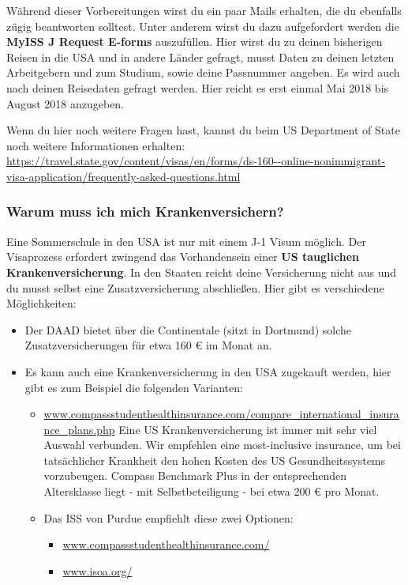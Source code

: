\documentclass[
  paper=a4,
  fontsize=12pt,
  DIV=16,
  headheight=52pt,
  footheight=45pt,
  headinclude,
  parskip=full,
]{scrartcl}
\begin{document}
Während dieser Vorbereitungen wirst du ein paar Mails erhalten, die du
ebenfalls zügig beantworten solltest.
Unter anderem wirst du dazu aufgefordert werden die
\textbf{MyISS J Request E-forms} auszufüllen.
Hier wirst du zu deinen bisherigen Reisen in die USA und in andere Länder
gefragt, musst Daten zu deinen letzten Arbeitgebern und zum Studium, sowie
deine Passnummer angeben.
Es wird auch nach deinen Reisedaten gefragt werden. Hier reicht es erst einmal
Mai 2018 bis August 2018 anzugeben.

Wenn du hier noch weitere Fragen hast, kannst du beim US Department of State
noch weitere Informationen erhalten:
\url{https://travel.state.gov/content/visas/en/forms/ds-160--online-nonimmigrant-visa-application/frequently-asked-questions.html}

\subsubsection*{Warum muss ich mich Krankenversichern?}
Eine Sommerschule in den USA ist nur mit einem J-1 Visum möglich.
Der Visaprozess erfordert zwingend das Vorhandensein einer
\textbf{US tauglichen Krankenversicherung}.
In den Staaten reicht deine Versicherung nicht aus und du musst selbst eine
Zusatzversicherung abschließen.
Hier gibt es verschiedene Möglichkeiten:
\begin{itemize}
  \item Der DAAD bietet über die Continentale (sitzt in Dortmund) solche
  Zusatzversicherungen für etwa 160 € im Monat an.
  \item Es kann auch eine Krankenversicherung in den USA zugekauft werden, hier
  gibt es zum Beispiel die folgenden Varianten:
  \begin{itemize}
    \item \url{www.compassstudenthealthinsurance.com/compare_international_insurance_plans.php}
    Eine US Krankenversicherung ist immer mit sehr viel Auswahl verbunden.
    Wir empfehlen eine most-inclusive insurance, um bei tatsächlicher Krankheit
    den hohen Kosten des US Gesundheitssystems vorzubeugen.
    Compass Benchmark Plus in der entsprechenden Altersklasse liegt - mit
    Selbstbeteiligung - bei etwa 200 € pro Monat.
    \item Das ISS von Purdue empfiehlt diese zwei Optionen:
    \begin{itemize}
      \item \url{www.compassstudenthealthinsurance.com/}
      \item \url{www.isoa.org/}
    \end{itemize}
  \end{itemize}
\end{itemize}
\end{document}

